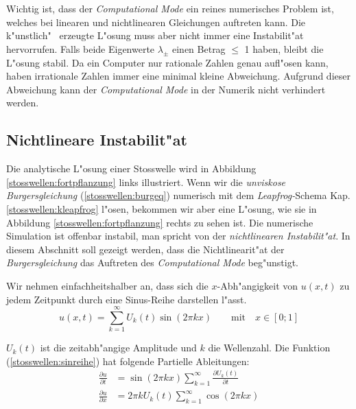\begin{refsection}
Wichtig ist, dass der \textit{Computational Mode} ein reines numerisches
Problem ist, welches bei linearen und nichtlinearen Gleichungen auftreten
kann. Die \grqq k"unstlich" \, erzeugte L"osung muss aber nicht immer
eine Instabilit"at hervorrufen. Falls beide Eigenwerte $\lambda_\pm$
einen Betrag $\leq$ 1 haben, bleibt die L"osung stabil. Da ein Computer
nur rationale Zahlen genau aufl"osen kann, haben irrationale Zahlen
immer eine minimal kleine Abweichung. Aufgrund dieser Abweichung kann
der \textit{Computational Mode} in der Numerik nicht verhindert werden.


\subsection{Nichtlineare Instabilit"at}
Die analytische L"osung einer Stosswelle wird in Abbildung
\ref{stosswellen:fortpflanzung} links illustriert. Wenn wir die
\textit{unviskose Burgersgleichung} (\ref{stosswellen:burgeq}) numerisch
mit dem \textit{Leapfrog-}Schema Kap. \ref{stosswellen:kleapfrog}
l"osen, bekommen wir aber eine L"osung, wie sie in Abbildung
\ref{stosswellen:fortpflanzung} rechts zu sehen ist. Die
numerische Simulation ist offenbar instabil, man spricht von der
\textit{nichtlinearen Instabilit"at}. In diesem Abschnitt soll gezeigt
werden, dass die Nichtlinearit"at der \textit{Burgersgleichung} das
Auftreten des \textit{Computational Mode} beg"unstigt. 

Wir nehmen einfachheitshalber an, dass sich die $x$-Abh"angigkeit von
$u(x,t)$ zu jedem Zeitpunkt durch eine Sinus-Reihe darstellen l"asst.
\begin{equation}
	u(x,t) = \sum_{k=1}^{\infty} U_{k}(t) \sin(2\pi kx) \qquad \text{mit} \quad x \in[0;1]
	\label{stosswellen:sinreihe}
\end{equation} 

$U_{k}(t)$ ist die zeitabh"angige Amplitude und $k$ die Wellenzahl. 
Die Funktion (\ref{stosswellen:sinreihe}) hat folgende Partielle Ableitungen:
\begin{align*}
	\frac{\partial u}{\partial t}&=
	\sin(2\pi k x) \sum_{k=1}^{\infty} \frac{\partial U_{k}(t)}{\partial t}
\\
	\frac{\partial u}{\partial x}&= 2\pi k U_{k}(t) \sum_{k=1}^{\infty} \cos(2\pi k x) 
\end{align*}


\end{refsection}

